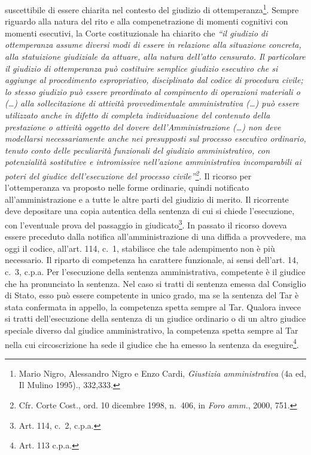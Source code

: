 \documentclass[12pt,it,a4paper,]{report}
\begin{document}
suscettibile di essere chiarita nel contesto del giudizio di
ottemperanza\footnote{{Mario Nigro, Alessandro Nigro e Enzo Cardi,
  \emph{Giustizia amministrativa} (4a ed, {Il Mulino} 1995).}, 332,333.}.
Sempre riguardo alla natura del rito e alla compenetrazione di momenti
cognitivi con momenti esecutivi, la Corte costituzionale ha chiarito che
\emph{``il giudizio di ottemperanza assume diversi modi di essere in
relazione alla situazione concreta, alla statuizione giudiziale da
attuare, alla natura dell'atto censurato. Il particolare il giudizio di
ottemperanza può costituire semplice giudizio esecutivo che si aggiunge
al procedimento espropriativo, disciplinato dal codice di procedura
civile; lo stesso giudizio può essere preordinato al compimento di
operazioni materiali o (\ldots) alla sollecitazione di attività
provvedimentale amministrativa (\ldots) può essere utilizzato anche in
difetto di completa individuazione del contenuto della prestazione o
attività oggetto del dovere dell'Amministrazione (\ldots) non deve
modellarsi necessariamente anche nei presupposti sul processo esecutivo
ordinario, tenuto conto delle peculiarità funzionali del giudizio
amministrativo, con potenzialità sostitutive e intromissive nell'azione
amministrativa incomparabili ai poteri del giudice dell'esecuzione del
processo civile''\footnote{Cfr. Corte Cost., ord. 10 dicembre 1998,
  n.~406, in \emph{Foro amm.}, 2000, 751.}.} Il ricorso per
l'ottemperanza va proposto nelle forme ordinarie, quindi notificato
all'amministrazione e a tutte le altre parti del giudizio di merito. Il
ricorrente deve depositare una copia autentica della sentenza di cui si
chiede l'esecuzione, con l'eventuale prova del passaggio in
giudicato\footnote{Art. 114, c.~2, c.p.a.}. In passato il ricorso doveva
essere preceduto dalla notifica all'amministrazione di una diffida a
provvedere, ma oggi il codice, all'art. 114, c.~1, stabilisce che tale
adempimento non è più necessario. Il riparto di competenza ha carattere
funzionale, ai sensi dell'art. 14, c.~3, c.p.a. Per l'esecuzione della
sentenza amministrativa, competente è il giudice che ha pronunciato la
sentenza. Nel caso si tratti di sentenza emessa dal Consiglio di Stato,
esso può essere competente in unico grado, ma se la sentenza del Tar è
stata confermata in appello, la competenza spetta sempre al Tar. Qualora
invece si tratti dell'esecuzione della sentenza di un giudice ordinario
o di un altro giudice speciale diverso dal giudice amministrativo, la
competenza spetta sempre al Tar nella cui circoscrizione ha sede il
giudice che ha emesso la sentenza da eseguire\footnote{Art. 113 c.p.a.}.
\end{document}
